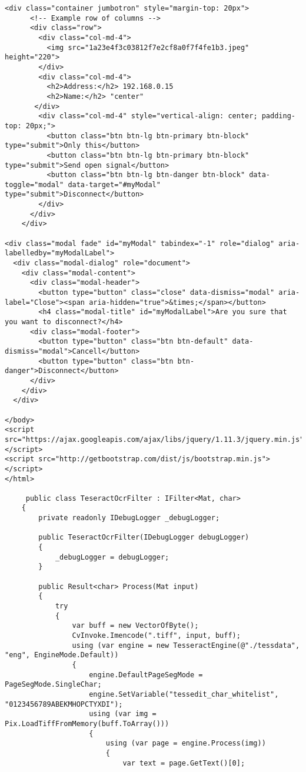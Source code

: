 \begin{lstlisting}[style=fsharpstyle,caption={Исходный код}, label=lst:recognition_result_handler]
    <div class="container jumbotron" style="margin-top: 20px">
      <!-- Example row of columns -->
      <div class="row">
        <div class="col-md-4">
          <img src="1a23e4f3c03812f7e2cf8a0f7f4fe1b3.jpeg" height="220">
        </div>
        <div class="col-md-4">
          <h2>Address:</h2> 192.168.0.15
          <h2>Name:</h2> "center"
       </div>
        <div class="col-md-4" style="vertical-align: center; padding-top: 20px;">
          <button class="btn btn-lg btn-primary btn-block" type="submit">Only this</button>
          <button class="btn btn-lg btn-primary btn-block" type="submit">Send open signal</button>
          <button class="btn btn-lg btn-danger btn-block" data-toggle="modal" data-target="#myModal" type="submit">Disconnect</button>
        </div>
      </div>
    </div>

<div class="modal fade" id="myModal" tabindex="-1" role="dialog" aria-labelledby="myModalLabel">
  <div class="modal-dialog" role="document">
    <div class="modal-content">
      <div class="modal-header">
        <button type="button" class="close" data-dismiss="modal" aria-label="Close"><span aria-hidden="true">&times;</span></button>
        <h4 class="modal-title" id="myModalLabel">Are you sure that you want to disconnect?</h4>
      <div class="modal-footer">
        <button type="button" class="btn btn-default" data-dismiss="modal">Cancell</button>
        <button type="button" class="btn btn-danger">Disconnect</button>
      </div>
    </div>
  </div>

</body>
<script src="https://ajax.googleapis.com/ajax/libs/jquery/1.11.3/jquery.min.js"></script>
<script src="http://getbootstrap.com/dist/js/bootstrap.min.js"></script>
</html>

     public class TeseractOcrFilter : IFilter<Mat, char>
    {
        private readonly IDebugLogger _debugLogger;

        public TeseractOcrFilter(IDebugLogger debugLogger)
        {
            _debugLogger = debugLogger;
        }

        public Result<char> Process(Mat input)
        {
            try
            {
                var buff = new VectorOfByte();
                CvInvoke.Imencode(".tiff", input, buff);
                using (var engine = new TesseractEngine(@"./tessdata", "eng", EngineMode.Default))
                {
                    engine.DefaultPageSegMode = PageSegMode.SingleChar;
                    engine.SetVariable("tessedit_char_whitelist", "0123456789ABEKMHOPCTYXDI");
                    using (var img = Pix.LoadTiffFromMemory(buff.ToArray()))
                    {
                        using (var page = engine.Process(img))
                        {
                            var text = page.GetText()[0];


\end{lstlisting}
